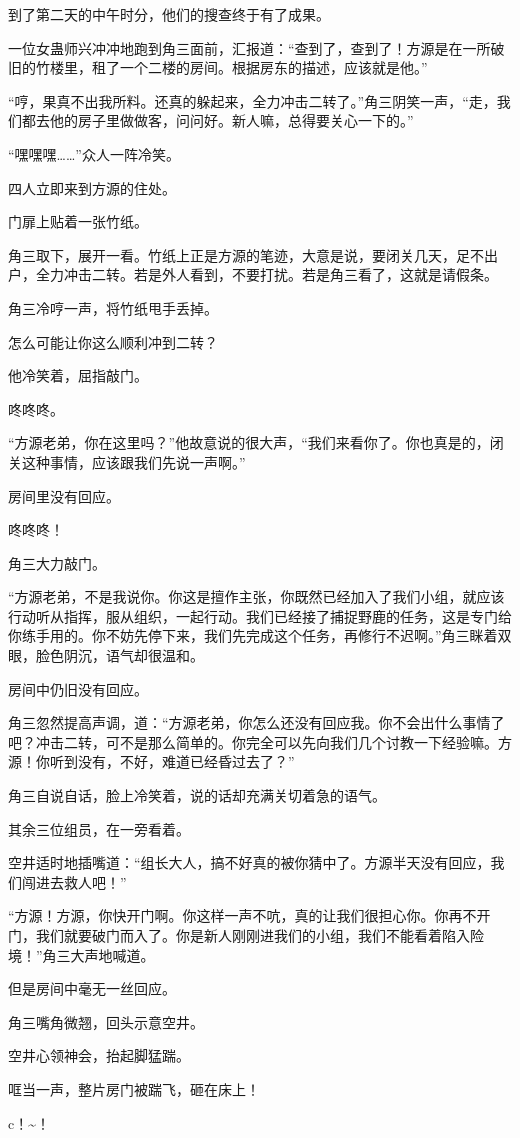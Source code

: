 \begin{this_body}
到了第二天的中午时分，他们的搜查终于有了成果。

一位女蛊师兴冲冲地跑到角三面前，汇报道：“查到了，查到了！方源是在一所破旧的竹楼里，租了一个二楼的房间。根据房东的描述，应该就是他。”

“哼，果真不出我所料。还真的躲起来，全力冲击二转了。”角三阴笑一声，“走，我们都去他的房子里做做客，问问好。新人嘛，总得要关心一下的。”

“嘿嘿嘿……”众人一阵冷笑。

四人立即来到方源的住处。

门扉上贴着一张竹纸。

角三取下，展开一看。竹纸上正是方源的笔迹，大意是说，要闭关几天，足不出户，全力冲击二转。若是外人看到，不要打扰。若是角三看了，这就是请假条。

角三冷哼一声，将竹纸甩手丢掉。

怎么可能让你这么顺利冲到二转？

他冷笑着，屈指敲门。

咚咚咚。

“方源老弟，你在这里吗？”他故意说的很大声，“我们来看你了。你也真是的，闭关这种事情，应该跟我们先说一声啊。”

房间里没有回应。

咚咚咚！

角三大力敲门。

“方源老弟，不是我说你。你这是擅作主张，你既然已经加入了我们小组，就应该行动听从指挥，服从组织，一起行动。我们已经接了捕捉野鹿的任务，这是专门给你练手用的。你不妨先停下来，我们先完成这个任务，再修行不迟啊。”角三眯着双眼，脸色阴沉，语气却很温和。

房间中仍旧没有回应。

角三忽然提高声调，道：“方源老弟，你怎么还没有回应我。你不会出什么事情了吧？冲击二转，可不是那么简单的。你完全可以先向我们几个讨教一下经验嘛。方源！你听到没有，不好，难道已经昏过去了？”

角三自说自话，脸上冷笑着，说的话却充满关切着急的语气。

其余三位组员，在一旁看着。

空井适时地插嘴道：“组长大人，搞不好真的被你猜中了。方源半天没有回应，我们闯进去救人吧！”

“方源！方源，你快开门啊。你这样一声不吭，真的让我们很担心你。你再不开门，我们就要破门而入了。你是新人刚刚进我们的小组，我们不能看着陷入险境！”角三大声地喊道。

但是房间中毫无一丝回应。

角三嘴角微翘，回头示意空井。

空井心领神会，抬起脚猛踹。

哐当一声，整片房门被踹飞，砸在床上！

c！\~{}！

\end{this_body}

